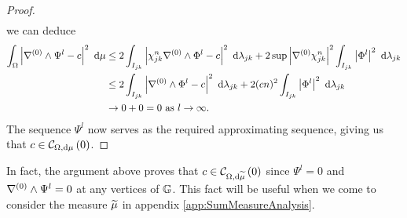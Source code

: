 \begin{proof}
\begin{align*}
	\end{align*}
	we can deduce
	\begin{align*}
		\int_{\Omega} \left\lvert  \nabla^{(0)}\wedge\Psi^l - c  \right\rvert^2  \ \mathrm{d}\mu
		&\leq 2\int_{I_{jk}} \left\lvert  \chi_{jk}^n\nabla^{(0)}\wedge\Phi^l - c  \right\rvert^2  \ \mathrm{d}\lambda_{jk}
		+ 2\sup\left\lvert \nabla^{(0)}\chi_{jk}^n \right\rvert^2 \int_{I_{jk}} \left\lvert  \Phi^l  \right\rvert^2  \ \mathrm{d}\lambda_{jk} \\
		&\leq2\int_{I_{jk}} \left\lvert  \nabla^{(0)}\wedge\Phi^l - c  \right\rvert^2  \ \mathrm{d}\lambda_{jk}
		+ 2(cn)^2 \int_{I_{jk}} \left\lvert  \Phi^l  \right\rvert^2  \ \mathrm{d}\lambda_{jk} \\
		&\rightarrow 0+0 = 0 \ \text{as} \ l \rightarrow\infty.
	\end{align*}
	The sequence $\Psi^l$ now serves as the required approximating sequence, giving us that $c\in\mathcal{C}_{ \Omega, \mathrm{d}\mu}\left( 0 \right)$.
\end{proof}
In fact, the argument above proves that $c\in\mathcal{C}_{ \Omega, \mathrm{d}\widetilde{\mu}}\left( 0 \right)$ since $\Psi^l=0$ and $\nabla^{(0)}\wedge\Psi^l=0$ at any vertices of $\mathbb{G}$.
This fact will be useful when we come to consider the measure $\widetilde{\mu}$ in appendix \ref{app:SumMeasureAnalysis}.

